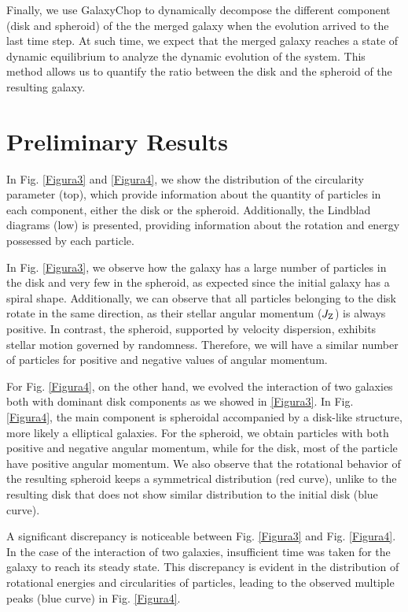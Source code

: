 \documentclass[baaa]{baaa}
\begin{document}
Finally, we use GalaxyChop to dynamically decompose the different component (disk and spheroid) of the the merged galaxy when the evolution arrived to the last time step. At such time, we expect that the merged galaxy reaches a state of dynamic equilibrium to analyze the dynamic evolution of the system. This method allows us to quantify the ratio between the disk and the spheroid of the resulting galaxy.

\section{Preliminary Results}
\label{sec:preliminary_results}

In Fig. \ref{Figura3} and \ref{Figura4}, we show the distribution of the circularity parameter (top), which provide information about the quantity of particles in each component, either the disk or the spheroid. Additionally, the Lindblad diagrams (low) is presented, providing information about the rotation and energy possessed by each particle.

In Fig. \ref{Figura3}, we observe how the galaxy has a large number of particles in the disk and very few in the spheroid, as expected since the initial galaxy has a spiral shape. Additionally, we can observe that all particles belonging to the disk rotate in the same direction, as their stellar angular momentum ($J_{\rm Z}$) is always positive. In contrast, the spheroid, supported by velocity dispersion, exhibits stellar motion governed by randomness. Therefore, we will have a similar number of particles for positive and negative values of angular momentum.

For Fig. \ref{Figura4}, on the other hand, we evolved the interaction of two galaxies both with dominant disk components as we showed in \ref{Figura3}. In Fig. \ref{Figura4}, the main component is spheroidal accompanied by a disk-like structure, more likely a elliptical galaxies. For the spheroid, we obtain particles with both positive and negative angular momentum, while for the disk, most of the particle have positive angular momentum. We also observe that the rotational behavior of the resulting spheroid keeps a symmetrical distribution (red curve), unlike to the resulting disk that does not show similar distribution to the initial disk (blue curve). 

A significant discrepancy is noticeable between Fig. \ref{Figura3} and Fig. \ref{Figura4}. In the case of the interaction of two galaxies, insufficient time was taken for the galaxy to reach its steady state. This discrepancy is evident in the distribution of rotational energies and circularities of particles, leading to the observed multiple peaks (blue curve) in Fig. \ref{Figura4}.
\end{document}
